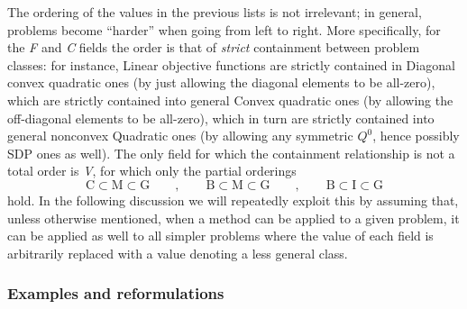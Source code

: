 The ordering of the values in the previous lists is not irrelevant; in general, problems become ``harder'' when going from left to right. More specifically, for the \textit{F} and \textit{C} fields the order is that of \emph{strict} containment between problem classes: for instance, Linear objective functions are strictly contained in Diagonal convex quadratic ones (by just allowing the diagonal elements to be all-zero), which are strictly contained into general Convex quadratic ones (by allowing the off-diagonal elements to be all-zero), which in turn are strictly contained into general nonconvex Quadratic ones (by allowing any symmetric $Q^0$, hence possibly SDP ones as well). The only field for which the containment relationship is not a total order is \textit{V}, for which only the partial orderings
\[
 \mbox{C} \subset \mbox{M} \subset \mbox{G}
 \qquad,\qquad
 \mbox{B} \subset \mbox{M} \subset \mbox{G}
 \qquad,\qquad
 \mbox{B} \subset \mbox{I} \subset \mbox{G}
\]
hold. In the following discussion we will repeatedly exploit this by assuming that, unless otherwise mentioned, when a method can be applied to a given problem, it can be applied as well to all simpler problems where the value of each field is arbitrarily replaced with a value denoting a less general class.

\subsubsection{Examples and reformulations}\label{ssec:reform}

